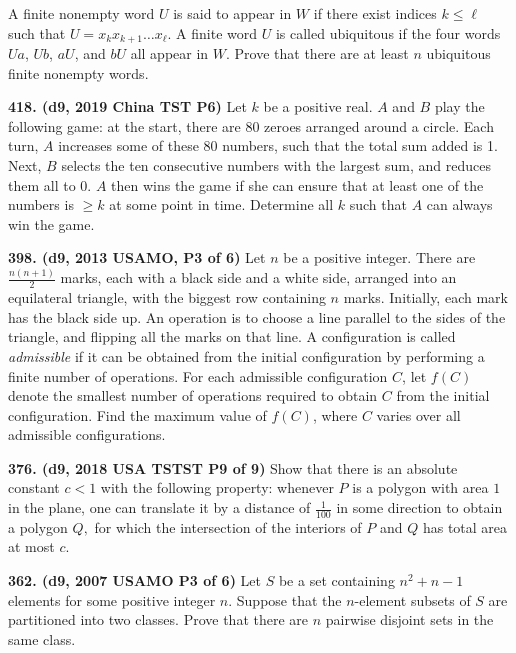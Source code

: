 \documentclass{article}
\begin{document}
A finite nonempty word $U$ is said to appear in $W$ if there exist indices $k \leq \ell$ such that $U=x_k x_{k+1} \ldots x_{\ell}$. A finite word $U$ is called ubiquitous if the four words $Ua$, $Ub$, $aU$, and $bU$ all appear in $W$. Prove that there are at least $n$ ubiquitous finite nonempty words.

\textbf{418. (\color{red}d9\color{black}, 2019 China TST P6)} Let $k$ be a positive real. $A$ and $B$ play the following game: at the start, there are $80$ zeroes arranged around a circle. Each turn, $A$ increases some of these $80$ numbers, such that the total sum added is 1. Next, $B$ selects the ten consecutive numbers with the largest sum, and reduces them all to $0.$ $A$ then wins the game if she can ensure that at least one of the numbers is $\geq k$ at some point in time.
\smallbreak
Determine all $k$ such that $A$ can always win the game.

\textbf{398. (\color{red}d9\color{black}, 2013 USAMO, P3 of 6)} Let $n$ be a positive integer. There are $\frac{n(n+1)}{2}$ marks, each with a black side and a white side, arranged into an equilateral triangle, with the biggest row containing $n$ marks. Initially, each mark has the black side up. An operation is to choose a line parallel to the sides of the triangle, and flipping all the marks on that line. A configuration is called \textit{admissible} if it can be obtained from the initial configuration by performing a finite number of operations. For each admissible configuration $C$, let $f(C)$ denote the smallest number of operations required to obtain $C$ from the initial configuration. Find the maximum value of $f(C)$, where $C$ varies over all admissible configurations.

\textbf{376. (\color{red}d9\color{black}, 2018 USA TSTST P9 of 9)} Show that there is an absolute constant $c < 1$ with the following property: whenever $P$ is a polygon with area $1$ in the plane, one can translate it by a distance of $\frac{1}{100}$ in some direction to obtain a polygon $Q,$ for which the intersection of the interiors of $P$ and $Q$ has total area at most $c.$

\textbf{362. (\color{red}d9\color{black}, 2007 USAMO P3 of 6)} Let $S$ be a set containing $n^2 + n - 1$ elements for some positive integer $n.$ Suppose that the $n$-element subsets of $S$ are partitioned into two classes. Prove that there are $n$ pairwise disjoint sets in the same class.
\end{document}
